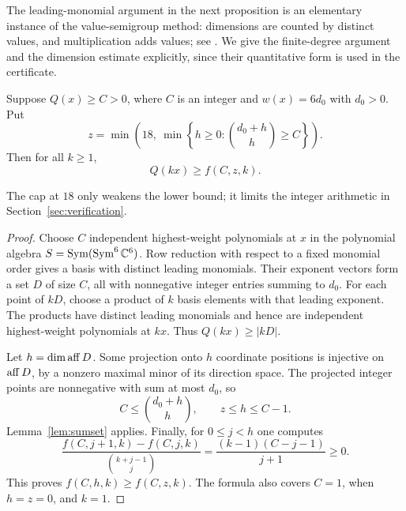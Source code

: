 The leading-monomial argument in the next proposition is an elementary
instance of the value-semigroup method: dimensions are counted by
distinct values, and multiplication adds values; see
\cite[preprint, Propositions~2.3, 2.6, and~2.10]{KavehKhovanskii2012}.
We give the finite-degree argument and the dimension estimate explicitly,
since their quantitative form is used in the certificate.

\begin{proposition}\label{prop:power}
Suppose \(Q(x)\ge C>0\), where \(C\) is an integer and
\(w(x)=6d_0\) with \(d_0>0\). Put
\[
 z=\min\left(18,\ \min\left\{h\ge0:
                              \binom{d_0+h}{h}\ge C\right\}\right).
\]
Then for all \(k\ge1\),
\begin{equation}\label{eq:power}
                Q(kx)\ge f(C,z,k).
\end{equation}
\end{proposition}
The cap at \(18\) only weakens the lower bound; it limits the integer
arithmetic in Section~\ref{sec:verification}.

\begin{proof}
Choose \(C\) independent highest-weight polynomials at \(x\) in the
polynomial algebra \(S=\operatorname{Sym}(\operatorname{Sym}^6\mathbb C^6)\). Row reduction with respect to
a fixed monomial order gives a basis with distinct leading monomials.
Their exponent vectors form a set \(D\) of size \(C\), all with
nonnegative integer entries summing to \(d_0\).
For each point of \(kD\), choose a product of \(k\) basis elements with
that leading exponent. The products have distinct leading monomials
and hence are independent highest-weight polynomials at \(kx\).
Thus \(Q(kx)\ge|kD|\).

Let \(h=\dim\operatorname{aff} D\). Some projection onto \(h\) coordinate positions
is injective on \(\operatorname{aff} D\), by a nonzero maximal minor of its direction
space. The projected integer points are nonnegative with sum at most
\(d_0\), so
\[
                     C\le\binom{d_0+h}{h},\qquad z\le h\le C-1.
\]
Lemma~\ref{lem:sumset} applies. Finally, for \(0\le j<h\) one computes
\[
 \frac{f(C,j+1,k)-f(C,j,k)}{\binom{k+j-1}{j}}
                  =\frac{(k-1)(C-j-1)}{j+1}\ge0.
\]
This proves \(f(C,h,k)\ge f(C,z,k)\). The formula also covers \(C=1\),
when \(h=z=0\), and \(k=1\).
\end{proof}
